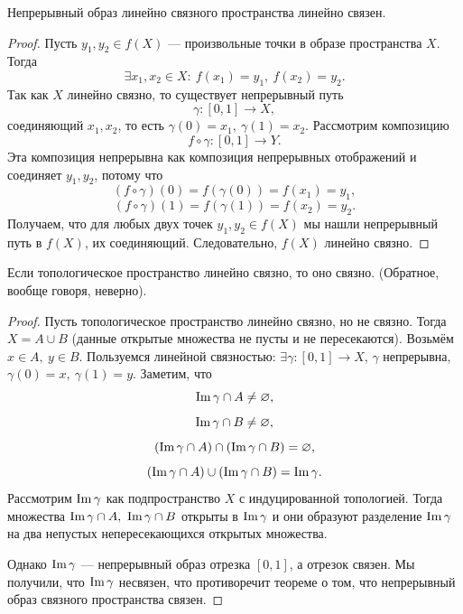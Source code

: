 \begin{statement}
    Непрерывный образ линейно связного пространства линейно связен.
\end{statement}
\begin{proof}
    Пусть $y_1, y_2 \in f(X)$ — произвольные точки в образе пространства $X$. Тогда $$\exists x_1, x_2 \in X: \ f(x_1) = y_1, \ f(x_2) = y_2.$$
    Так как $X$ линейно связно, то существует непрерывный путь 
    \[\gamma: [0,1] \to X,\]
    соединяющий $x_1, x_2$, то есть $\gamma(0) = x_1, \ \gamma(1) = x_2$.
Рассмотрим композицию
\[f \circ \gamma: [0,1] \to Y.\]
Эта композиция непрерывна как композиция непрерывных отображений и соединяет $y_1, y_2$, потому что 
\[(f \circ \gamma)(0) = f(\gamma(0)) = f(x_1) = y_1,\]
\[(f \circ \gamma)(1) = f(\gamma(1)) = f(x_2) = y_2.\]
Получаем, что для любых двух точек $y_1, y_2 \in f(X)$ мы нашли непрерывный путь в $f(X)$, их соединяющий. Следовательно, $f(X)$ линейно связно.
\end{proof}

\begin{statement}
    Если топологическое пространство линейно связно, то оно связно. (Обратное, вообще говоря, неверно).
\end{statement}
\begin{proof}
    Пусть топологическое пространство линейно связно, но не связно. Тогда $X = A \cup B$ (данные открытые множества не пусты и не пересекаются). Возьмём $x \in A, \ y \in B$. Пользуемся линейной связностью: $\exists \gamma: [0, 1] \to X$, $\gamma$ непрерывна, $\gamma(0) = x, \ \gamma(1) = y$.
    Заметим, что $$\operatorname*{Im} \gamma \cap A \neq \varnothing,$$ 
    $$\operatorname*{Im} \gamma \cap B \neq \varnothing,$$
    $$(\operatorname*{Im} \gamma \cap A) \cap (\operatorname*{Im} \gamma \cap B) = \varnothing,$$
    $$(\operatorname*{Im} \gamma \cap A) \cup (\operatorname*{Im} \gamma \cap B) = \operatorname*{Im} \gamma.$$
    Рассмотрим $\operatorname*{Im} \gamma$ как подпространство $X$ с индуцированной топологией. Тогда множества $\operatorname*{Im} \gamma \cap A, \ \operatorname*{Im} \gamma \cap B$ открыты в $\operatorname*{Im} \gamma$ и они образуют разделение $\operatorname*{Im} \gamma$ на два непустых непересекающихся открытых множества.

    Однако $\operatorname*{Im} \gamma$ — непрерывный образ отрезка $[0,1]$, а отрезок связен. Мы получили, что $\operatorname*{Im} \gamma$ несвязен, что противоречит теореме о том, что непрерывный образ связного пространства связен.
\end{proof}

